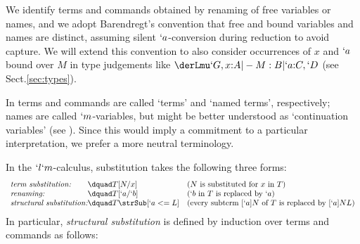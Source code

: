 \documentclass{lmcs}
\newcommand{\Comment}[1]{}
\begin{document}
We identify terms and commands obtained by renaming of free variables or names, and we adopt Barendregt's convention that free and bound variables and names are distinct, assuming silent $`a$-conversion during reduction to avoid capture.
We will extend this convention to also consider occurrences of $x$ and $`a$ bound over $M$ in type judgements like $\derLmu `G,x{:}A |- M : B | `a{:}C,`D $ (see Sect.\skp\ref{sec:types}).

\Comment{%
Note that we could have defined the set of \emph{pure $`l`m$-terms} via the grammar:
%
%
 \[ \begin{array}{rcl}
M,N & :: =& x \mid `lx.M \mid MN \mid `m`a.[`b]M
 \end{array} \]
but it is convenient to have commands as part of the syntax as well.
}%

In \cite{Parigot'92} terms and commands are called `terms' and `named terms', respectively; names are called $`m$-variables, but might be better understood as `continuation variables' (see \cite{Streicher-Reus'98}).
Since this would imply a %
commitment to a particular interpretation, we prefer a more neutral terminology.

In the $`l`m$-calculus, substitution takes the following three forms:
%
%
 \[ \begin{array}{l@{\dquad}ll}
 \textit{term substitution:} & T[N/x] & (\textrm{$N$ is substituted for $x$ in $T$}) \\
 \textit{renaming:} & T[`a/`b] & (\textrm{$`b$ in $T$ is replaced by $`a$}) \\
 \textit{structural substitution:} & T \strSub[`a<=L] & (\textrm{every subterm $[`a]N$ of $T$ is replaced by $[`a]NL$})
 \end{array} \]
In particular, \emph{structural substitution} is defined by induction over terms and commands as follows:
\end{document}
